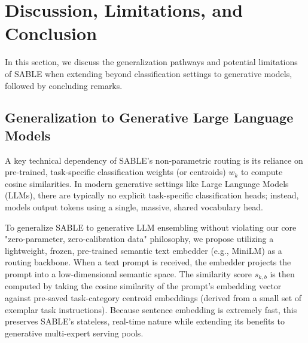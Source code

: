 \section{Discussion, Limitations, and Conclusion}
\label{sec:conclusion}

In this section, we discuss the generalization pathways and potential limitations of SABLE when extending beyond classification settings to generative models, followed by concluding remarks.

\subsection{Generalization to Generative Large Language Models}
A key technical dependency of SABLE's non-parametric routing is its reliance on pre-trained, task-specific classification weights (or centroids) $w_k$ to compute cosine similarities. In modern generative settings like Large Language Models (LLMs), there are typically no explicit task-specific classification heads; instead, models output tokens using a single, massive, shared vocabulary head. 

To generalize SABLE to generative LLM ensembling without violating our core "zero-parameter, zero-calibration data" philosophy, we propose utilizing a lightweight, frozen, pre-trained semantic text embedder (e.g., MiniLM) as a routing backbone. When a text prompt is received, the embedder projects the prompt into a low-dimensional semantic space. The similarity score $s_{k, b}$ is then computed by taking the cosine similarity of the prompt's embedding vector against pre-saved task-category centroid embeddings (derived from a small set of exemplar task instructions). Because sentence embedding is extremely fast, this preserves SABLE's stateless, real-time nature while extending its benefits to generative multi-expert serving pools. 

